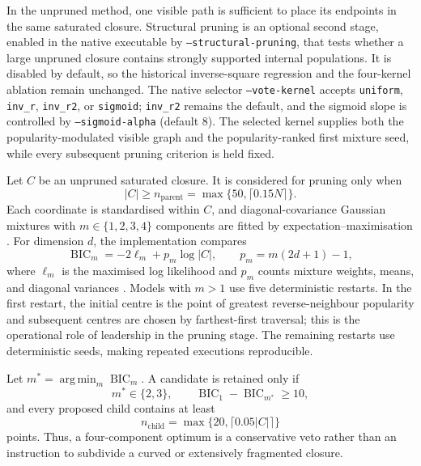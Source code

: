 \documentclass[pdflatex,sn-mathphys-num]{sn-jnl}
\newcommand{\argmin}{\operatorname*{arg\,min}}
\begin{document}
In the unpruned method, one visible path is sufficient to place its endpoints
in the same saturated closure. Structural pruning is an
optional second stage, enabled in the native executable by
\texttt{--structural-pruning}, that tests whether a large unpruned closure
contains strongly supported internal populations.  It is disabled by default,
so the historical inverse-square regression and the four-kernel ablation remain
unchanged.  The native selector \texttt{--vote-kernel} accepts
\texttt{uniform}, \texttt{inv\_r}, \texttt{inv\_r2}, or \texttt{sigmoid};
\texttt{inv\_r2} remains the default, and the sigmoid slope is controlled by
\texttt{--sigmoid-alpha} (default $8$).  The selected kernel supplies both the
popularity-modulated visible graph and the popularity-ranked first mixture
seed, while every subsequent pruning criterion is held fixed.

Let $C$ be an unpruned saturated closure. It is considered for pruning only when
\begin{equation}
|C|\geq n_{\mathrm{parent}}
=\max\{50,\lceil0.15N\rceil\}.
\label{eq:pruning_parent_size}
\end{equation}
Each coordinate is standardised within $C$, and diagonal-covariance Gaussian
mixtures with $m\in\{1,2,3,4\}$ components are fitted by expectation--maximisation
\citep{DempsterLairdRubin1977}.  For dimension $d$, the implementation compares
\begin{equation}
\operatorname{BIC}_m=-2\ell_m+p_m\log |C|,
\qquad p_m=m(2d+1)-1,
\label{eq:pruning_bic}
\end{equation}
where $\ell_m$ is the maximised log likelihood and $p_m$ counts mixture
weights, means, and diagonal variances \citep{Schwarz1978}.  Models with
$m>1$ use five deterministic restarts.  In the first restart, the initial
centre is the point of greatest reverse-neighbour popularity and subsequent
centres are chosen by farthest-first traversal; this is the operational role
of leadership in the pruning stage.  The remaining restarts use deterministic
seeds, making repeated executions reproducible.

Let $m^*=\argmin_m\operatorname{BIC}_m$.  A candidate is retained only if
\begin{equation}
m^*\in\{2,3\},\qquad
\operatorname{BIC}_1-\operatorname{BIC}_{m^*}\geq10,
\label{eq:pruning_acceptance}
\end{equation}
and every proposed child contains at least
\begin{equation}
n_{\mathrm{child}}=
\max\{20,\lceil0.05|C|\rceil\}
\label{eq:pruning_child_size}
\end{equation}
points.  Thus, a four-component optimum is a conservative veto rather than an
instruction to subdivide a curved or extensively fragmented closure.
\end{document}

